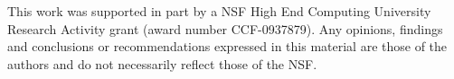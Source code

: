This work was supported in part by a NSF High End Computing University
Research Activity grant (award number CCF-0937879). Any opinions,
findings and conclusions or recommendations expressed in this material
are those of the authors and do not necessarily reflect those of the
NSF.
